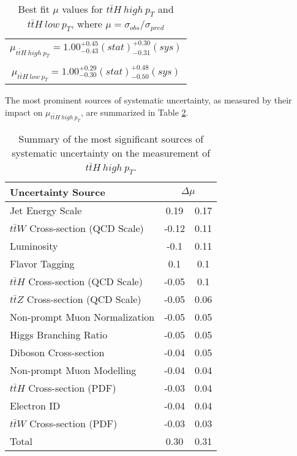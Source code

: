 \begin{table}[H]
  \centering
  \begin{tabular}{c}
     $\mu_{t\bar{t}H\ high\ p_T} = 1.00^{+0.45}_{-0.43}(stat)^{+0.30}_{-0.31}(sys)$ \\
     \\
     $\mu_{t\bar{t}H\ low\ p_T} = 1.00^{+0.29}_{-0.30}(stat)^{+0.48}_{-0.50}(sys)$ \\
  \end{tabular}
  \caption{Best fit $\mu$ values for $t\bar{t}H\ high\ p_T$ and  $t\bar{t}H\ low\ p_T$, where $\mu = \sigma_{obs}/\sigma_{pred}$} 
  \label{tab:mu140}
\end{table}

The most prominent sources of systematic uncertainty, as measured by their impact on $\mu_{t\bar{t}H\ high\ p_T}$, are summarized in Table \ref{tab:systematics_high_140}.

\begin{table}[H]
    \centering
    \begin{tabular}{l|cc}                                                                                                    
        \hline\hline
        Uncertainty Source & \multicolumn{2}{c}{$\Delta \mu$ }  \\
        \hline
        Jet Energy Scale & 0.19 & 0.17 \\
        $t\bar{t}W$ Cross-section (QCD Scale) & -0.12 & 0.11 \\
        Luminosity & -0.1 & 0.11 \\
        Flavor Tagging & 0.1 & 0.1 \\
        $t\bar{t}H$ Cross-section (QCD Scale) & -0.05 & 0.1 \\
        $t\bar{t}Z$ Cross-section (QCD Scale) & -0.05 & 0.06 \\
        Non-prompt Muon Normalization & -0.05 & 0.05 \\
        Higgs Branching Ratio & -0.05 & 0.05 \\
        Diboson Cross-section & -0.04 & 0.05 \\
        Non-prompt Muon Modelling & -0.04 & 0.04 \\
        $t\bar{t}H$ Cross-section (PDF) & -0.03 & 0.04 \\
        Electron ID & -0.04 & 0.04 \\
        $t\bar{t}W$ Cross-section (PDF) & -0.03 & 0.03 \\
        \hline
        Total & 0.30 & 0.31 \\
        \hline\hline
    \end{tabular}
    \caption{Summary of the most significant sources of systematic uncertainty on the measurement of $t\bar{t}H\ high\ p_T$.}
    \label{tab:systematics_high_140}
\end{table}


